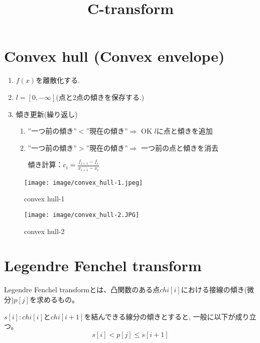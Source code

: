 \documentclass{jsarticle}
\theoremstyle{definition}
\begin{document}
\title{C-transform}

\maketitle

\section{Convex hull (Convex envelope)}


\begin{enumerate}
   \item $f(x)$を離散化する.
   \item $l = [0, - \infty ]$(点と2点の傾きを保存する.) 
   \item 傾き更新(繰り返し)
   \begin{enumerate}
   	\item ''一つ前の傾き''$ < $''現在の傾き''$\Rightarrow$ OK $l$に点と傾きを追加
   	\item ''一つ前の傾き''$ > $''現在の傾き''$\Rightarrow$ 一つ前の点と傾きを消去
   	
   	傾き計算：$c_i = \tfrac{f_{i+1} - f_i}{x_{i+1}- x_i}$
   \end{enumerate}
\end{enumerate}


\begin{figure}[htbp]
 \begin{minipage}{0.5\hsize}
  \begin{center}
   \texttt{[image: image/convex\_hull-1.jpeg]}
  \end{center}
  \caption{convex hull-1}
  \label{fig:one}
 \end{minipage}
 \begin{minipage}{0.5\hsize}
  \begin{center}
   \texttt{[image: image/convex\_hull-2.JPG]}
  \end{center}
  \caption{convex hull-2}
  \label{fig:two}
 \end{minipage}
\end{figure}

\section{Legendre Fenchel transform}
Legendre Fenchel transformとは、凸関数のある点$chi[i]$における接線の傾き(微分)$p[j]$を求めるもの。

$s[i]: chi[i]$と$chi[i+1]$を結んできる線分の傾きとすると, 一般に以下が成り立つ。
\[
s[i] < p[j] \leq s[i+1]
\]
\end{document}
